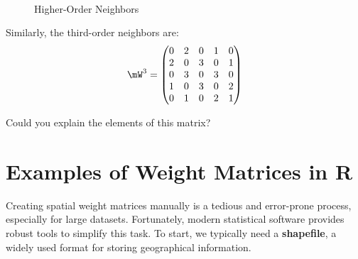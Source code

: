 \documentclass[english,12pt]{book}\usepackage[]{graphicx}\usepackage[]{xcolor}
\begin{document}
\begin{figure}[ht]
\caption{Higher-Order Neighbors}
\label{fig:example_hon}
\centering
{}
\\
\vspace{1cm}
\end{figure}

Similarly, the third-order neighbors are: 
\begin{equation*}
\mW^3 = \begin{pmatrix}
      0 & 2 & 0 & 1 & 0 \\
      2 & 0 & 3 & 0 & 1 \\
      0 & 3 & 0 & 3 & 0 \\
      1 & 0 & 3 & 0 & 2 \\
      0 & 1 & 0 & 2 & 1
      \end{pmatrix}
\end{equation*}

Could you explain the elements of this matrix?

\section{Examples of Weight Matrices in R}

Creating spatial weight matrices manually is a tedious and error-prone process, especially for large datasets. Fortunately, modern statistical software provides robust tools to simplify this task. To start, we typically need a \textbf{shapefile}, a widely used format for storing geographical information.
\end{document}
